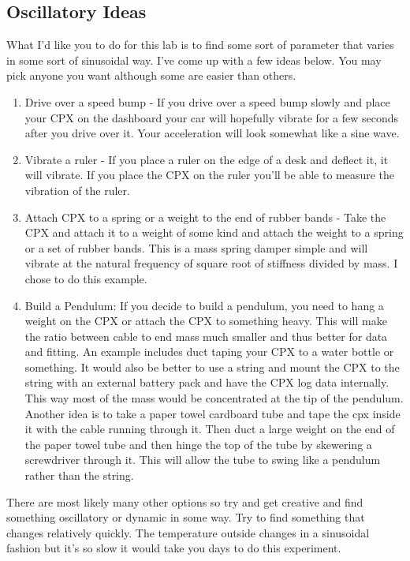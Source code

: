\subsection{Oscillatory Ideas}

What I’d like you to do for this lab is to find some sort of parameter that varies in some sort of sinusoidal way. I’ve come up with a few ideas below. You may pick anyone you want although some are easier than others.

\begin{enumerate}[itemsep=-5pt]
\item Drive over a speed bump - If you drive over a speed bump slowly and place your CPX on the dashboard your car will hopefully vibrate for a few seconds after you drive over it. Your acceleration will look somewhat like a sine wave.
\item Vibrate a ruler - If you place a ruler on the edge of a desk and deflect it, it will vibrate. If you place the CPX on the ruler you’ll be able to measure the vibration of the ruler.
\item Attach CPX to a spring or a weight to the end of rubber bands - Take the CPX and attach it to a weight of some kind and attach the weight to a spring or a set of rubber bands. This is a mass spring damper simple and will vibrate at the natural frequency of square root of stiffness divided by mass. I chose to do this example.
\item Build a Pendulum: If you decide to build a pendulum, you need to hang a weight on the CPX or attach the CPX to something heavy. This will make the ratio between cable to end mass much smaller and thus better for data and fitting. An example includes  duct taping your CPX to a water bottle or something. It would also be better to use a string and mount the CPX to the string with an external battery pack and have the CPX log data internally. This way most of the mass would be concentrated at the tip of the pendulum. Another idea is to take a paper towel cardboard tube and tape the cpx inside it with the cable running through it. Then duct a large weight on the end of the paper towel tube and then hinge the top of the tube by skewering a screwdriver through it. This will allow the tube to swing like a pendulum rather than the string. 
\end{enumerate}
There are most likely many other options so try and get creative and find something oscillatory or dynamic in some way. Try to find something that changes relatively quickly. The temperature outside changes in a sinusoidal fashion but it’s so slow it would take you days to do this experiment. 

